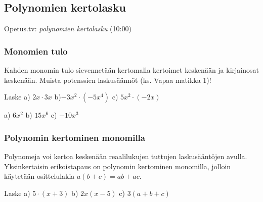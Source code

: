 \subsection*{Polynomien kertolasku}

{Opetus.tv: \emph{polynomien kertolasku} (10:00)}

\subsubsection*{Monomien tulo}

Kahden monomin tulo sievennetään kertomalla kertoimet keskenään ja kirjainosat keskenään. Muista potenssien laskusäännöt (ks. Vapaa matikka 1)!

\begin{esimerkki}
    Laske \quad 
    a) $2x\cdot 3x$ \quad
    b)$-3x^2\cdot (-5x^4)$ \quad
    c) $5x^2 \cdot (-2x)$
    \begin{esimratk}
        \begin{alakohdat}
        \end{alakohdat}
    \end{esimratk}
    \begin{esimvast}
        a) $6x^2$ \quad
        b) $15x^6$ \quad
        c) $-10x^3$
    \end{esimvast}
\end{esimerkki}

\subsubsection*{Polynomin kertominen monomilla}

Polynomeja voi kertoa keskenään reaalilukujen tuttujen laskusääntöjen avulla. Yksinkertaisin erikoistapaus on polynomin kertominen monomilla, jolloin
käytetään osittelulakia $a(b+c)=ab+ac$.

\begin{esimerkki}
Laske \quad a) $5\cdot(x+3)$ \quad b) $2x(x-5)$ \quad 
c) $3(a+b+c)$
\begin{alakohdat}
\end{alakohdat}
\end{esimerkki} 

